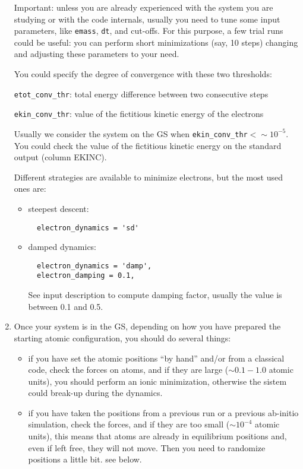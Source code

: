 \documentclass[12pt,a4paper]{article}
\begin{document}
\begin{enumerate}
    Important: unless you are already experienced with the system you
    are studying or with the code internals, usually you need to tune
    some input parameters, like \texttt{emass}, \texttt{dt}, and
    cut-offs.
    For this purpose, a few trial runs could be useful: you can
    perform short minimizations (say, 10 steps) changing and adjusting
    these parameters to your need.

    You could specify the degree of convergence with these two
    thresholds:

    \texttt{etot\_conv\_thr}: total energy difference between two
    consecutive steps

    \texttt{ekin\_conv\_thr}: value of the fictitious kinetic energy
    of the electrons

    Usually we consider the system on the GS when
    \texttt{ekin\_conv\_thr}${} < \sim 10^{-5}$.
    You could check the value of the fictitious kinetic energy on the 
    standard output (column EKINC).

    Different strategies are available to minimize electrons, but the
    most used ones are:
    \begin{itemize}
      \item
        steepest descent:
\begin{verbatim}
  electron_dynamics = 'sd'
\end{verbatim}
      \item
         damped dynamics:
\begin{verbatim}
  electron_dynamics = 'damp', 
  electron_damping = 0.1,
\end{verbatim}
         See input description to compute damping factor, usually the
         value is between 0.1 and 0.5.
    \end{itemize}

  \item
    Once your system is in the GS, depending on how you have prepared
    the starting atomic configuration, you should do several things:
    \begin{itemize}
      \item
        if you have set the atomic positions ``by hand'' and/or from a
        classical code, check the forces on atoms, and if they are
        large ($\sim 0.1 - 1.0$ atomic units), you should perform an
        ionic minimization, otherwise the sistem could break-up during
        the dynamics.
      \item
        if you have taken the positions from a previous run or a
        previous ab-initio simulation, check the forces, and if they
        are too small ($\sim 10^{-4}$ atomic units), this means that
        atoms are already in equilibrium positions and, even if left
        free, they will not move.
        Then you need to randomize positions a little bit. see below.
    \end{itemize}


\end{enumerate}
\end{document}
